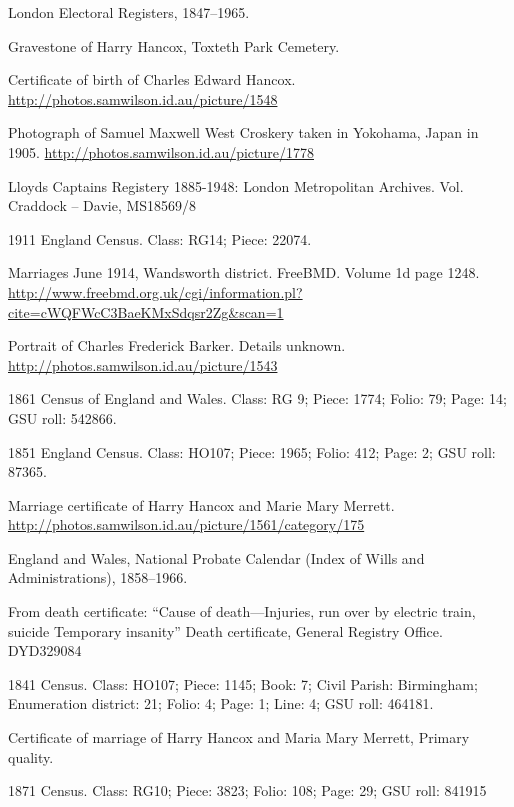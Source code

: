 \begin{thebibliography}{99}
	London Electoral Registers, 1847--1965.

	Gravestone of Harry Hancox, Toxteth Park Cemetery.

	Certificate of birth of Charles Edward Hancox. \url{http://photos.samwilson.id.au/picture/1548}

	Photograph of Samuel Maxwell West Croskery taken in Yokohama, Japan in 1905.
	\url{http://photos.samwilson.id.au/picture/1778}

	Lloyds Captains Registery 1885-1948: London Metropolitan Archives. Vol. Craddock -- Davie, MS18569/8

	1911 England Census. Class: RG14; Piece: 22074.

	Marriages June 1914, Wandsworth district. FreeBMD. Volume 1d page 1248.
	\url{http://www.freebmd.org.uk/cgi/information.pl?cite=cWQFWcC3BaeKMxSdqsr2Zg&scan=1}

	Portrait of Charles Frederick Barker. Details unknown.
	\url{http://photos.samwilson.id.au/picture/1543}

	1861 Census of England and Wales.
	Class: RG 9; Piece: 1774; Folio: 79; Page: 14; GSU roll: 542866.

	1851 England Census.
	Class: HO107; Piece: 1965; Folio: 412; Page: 2; GSU roll: 87365.

	Marriage certificate of Harry Hancox and Marie Mary Merrett.
	\url{http://photos.samwilson.id.au/picture/1561/category/175}

	England and Wales, National Probate Calendar (Index of Wills and Administrations), 1858--1966.

	From death certificate: ``Cause of death---Injuries, run over by electric train, suicide Temporary insanity''
	Death certificate, General Registry Office. DYD329084
	
	1841 Census. 
	Class: HO107; Piece: 1145; Book: 7; Civil Parish: Birmingham; Enumeration district: 21; Folio: 4; Page: 1; Line: 4; GSU roll: 464181.

	Certificate of marriage of Harry Hancox and Maria Mary Merrett, Primary quality. 
	
	1871 Census.
	Class: RG10; Piece: 3823; Folio: 108; Page: 29; GSU roll: 841915
	

\end{thebibliography}
